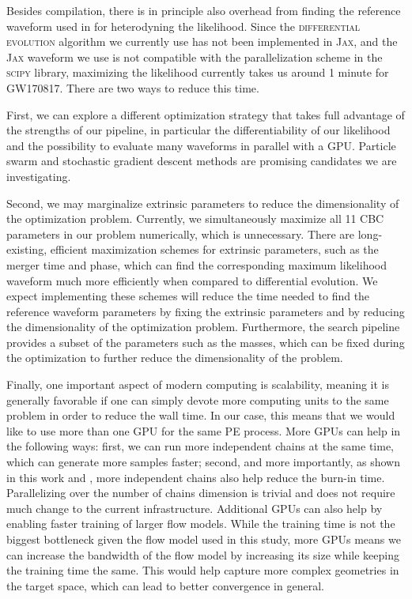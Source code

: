 \documentclass[twocolumn]{aastex631}
\begin{document}
Besides compilation, there is in principle also overhead from finding the
reference waveform used in for heterodyning the likelihood. Since the
\textsc{differential evolution} algorithm we currently use has not been
implemented in \textsc{Jax}, and the \textsc{Jax} waveform we use is not
compatible with the parallelization scheme in the \textsc{scipy} library,
maximizing the likelihood currently takes us around 1 minute for GW170817. There
are two ways to reduce this time.

First, we can explore a different optimization strategy that
takes full advantage of the strengths of our pipeline, in particular the
differentiability of our likelihood and the possibility to evaluate many
waveforms in parallel with a GPU. Particle swarm \citep{7869491} and stochastic
gradient descent methods \citep{10.5555/304710.304720} are promising candidates
we are investigating.

Second, we may marginalize extrinsic parameters to reduce the dimensionality of
the optimization problem. Currently, we simultaneously maximize all 11 CBC
parameters in our problem numerically, which is unnecessary. There are
long-existing, efficient maximization schemes for extrinsic parameters, such as
the merger time and phase, which can find the corresponding maximum likelihood
waveform much more efficiently when compared to differential evolution. We
expect implementing these schemes will reduce the time needed to find the
reference waveform parameters by fixing the extrinsic parameters and by reducing
the dimensionality of the optimization problem. Furthermore, the search pipeline
provides a subset of the parameters such as the masses, which can be fixed during the
optimization to further reduce the dimensionality of the problem.

Finally, one important aspect of modern computing is scalability, meaning it is
generally favorable if one can simply devote more computing units to the same
problem in order to reduce the wall time. In our case, this means that we would like to
use more than one GPU for the same PE process. More GPUs can help in the
following ways: first, we can run more independent chains at
the same time, which can generate more samples faster; second, and more
importantly, as shown in this work and \cite{2022arXiv221106397W}, more independent
chains also help reduce the burn-in time. Parallelizing over the number
of chains dimension is trivial and does not require much change to the current
infrastructure. Additional GPUs can also help by enabling faster training of
larger flow models. While the training time is not the biggest bottleneck given
the flow model used in this study, more GPUs means we can increase the
bandwidth of the flow model by increasing its size while keeping the training
time the same. This would help capture more complex geometries in the target
space, which can lead to better convergence in general.
\end{document}
